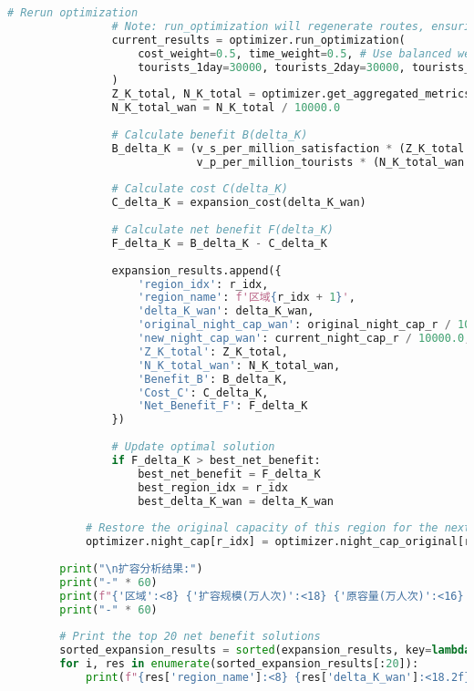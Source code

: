 \begin{lstlisting}[language=Python]
                # Rerun optimization
                # Note: run_optimization will regenerate routes, ensuring each run is based on the modified capacity
                current_results = optimizer.run_optimization(
                    cost_weight=0.5, time_weight=0.5, # Use balanced weights for expansion analysis
                    tourists_1day=30000, tourists_2day=30000, tourists_3day=20000
                )
                Z_K_total, N_K_total = optimizer.get_aggregated_metrics(current_results)
                N_K_total_wan = N_K_total / 10000.0
    
                # Calculate benefit B(delta_K)
                B_delta_K = (v_s_per_million_satisfaction * (Z_K_total - Z_K0_total) + 
                             v_p_per_million_tourists * (N_K_total_wan - N_K0_total_wan))
                
                # Calculate cost C(delta_K)
                C_delta_K = expansion_cost(delta_K_wan)
                
                # Calculate net benefit F(delta_K)
                F_delta_K = B_delta_K - C_delta_K
                
                expansion_results.append({
                    'region_idx': r_idx,
                    'region_name': f'区域{r_idx + 1}',
                    'delta_K_wan': delta_K_wan,
                    'original_night_cap_wan': original_night_cap_r / 10000.0,
                    'new_night_cap_wan': current_night_cap_r / 10000.0,
                    'Z_K_total': Z_K_total,
                    'N_K_total_wan': N_K_total_wan,
                    'Benefit_B': B_delta_K,
                    'Cost_C': C_delta_K,
                    'Net_Benefit_F': F_delta_K
                })
    
                # Update optimal solution
                if F_delta_K > best_net_benefit:
                    best_net_benefit = F_delta_K
                    best_region_idx = r_idx
                    best_delta_K_wan = delta_K_wan
    
            # Restore the original capacity of this region for the next region's test
            optimizer.night_cap[r_idx] = optimizer.night_cap_original[r_idx]
    
        print("\n扩容分析结果:")
        print("-" * 60)
        print(f"{'区域':<8} {'扩容规模(万人次)':<18} {'原容量(万人次)':<16} {'新容量(万人次)':<16} {'净收益(亿元)':<12}")
        print("-" * 60)
        
        # Print the top 20 net benefit solutions
        sorted_expansion_results = sorted(expansion_results, key=lambda x: x['Net_Benefit_F'], reverse=True)
        for i, res in enumerate(sorted_expansion_results[:20]):
            print(f"{res['region_name']:<8} {res['delta_K_wan']:<18.2f} {res['original_night_cap_wan']:<16.2f} {res['new_night_cap_wan']:<16.2f} {res['Net_Benefit_F']:<12.4f}")
    

\end{lstlisting}
